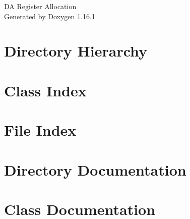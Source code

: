 \documentclass[twoside]{book}
\newcommand{\+}{\discretionary{\mbox{\scriptsize$\hookleftarrow$}}{}{}}
\newcommand{\clearemptydoublepage}{%
    \newpage{\pagestyle{empty}\cleardoublepage}%
  }
\begin{document}
  \raggedbottom
    \hypersetup{pageanchor=false,
                bookmarksnumbered=true,
                pdfencoding=unicode
               }
  \begin{titlepage}
  \vspace*{7cm}
  \begin{center}%
  {\Large DA Register Allocation}\\
  \vspace*{1cm}
  {\large Generated by Doxygen 1.16.1}\\
  \end{center}
  \end{titlepage}
  \clearemptydoublepage
  \tableofcontents
  \clearemptydoublepage
  \hypersetup{pageanchor=true}
\chapter{Directory Hierarchy}

\chapter{Class Index}

\chapter{File Index}

\chapter{Directory Documentation}












\chapter{Class Documentation}













\end{document}
